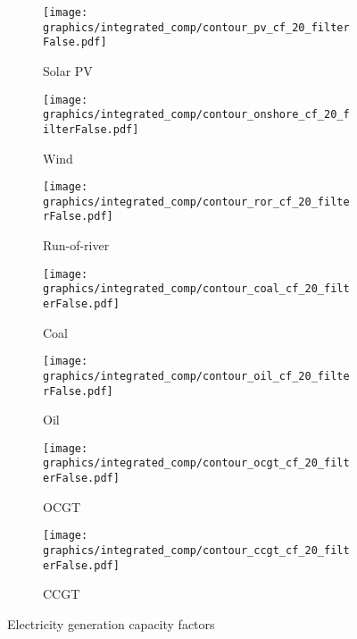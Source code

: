 \begin{figure*}[t] %
    \centering
    \begin{subfigure}[b]{0.45\linewidth}
        \centering
        \texttt{[image: graphics/integrated\_comp/contour\_pv\_cf\_20\_filterFalse.pdf]}
        \caption{Solar PV}
    \end{subfigure}
    \hfill
    \begin{subfigure}[b]{0.45\linewidth}
        \centering
        \texttt{[image: graphics/integrated\_comp/contour\_onshore\_cf\_20\_filterFalse.pdf]}
        \caption{Wind}
    \end{subfigure}
    \hfill
    \begin{subfigure}[b]{0.45\linewidth}
        \centering
        \texttt{[image: graphics/integrated\_comp/contour\_ror\_cf\_20\_filterFalse.pdf]}
        \caption{Run-of-river}
    \end{subfigure}
    \hfill
    \begin{subfigure}[b]{0.45\linewidth}
        \centering
        \texttt{[image: graphics/integrated\_comp/contour\_coal\_cf\_20\_filterFalse.pdf]}
        \caption{Coal}
    \end{subfigure}
    \hfill
    \begin{subfigure}[b]{0.45\linewidth}
        \centering
        \texttt{[image: graphics/integrated\_comp/contour\_oil\_cf\_20\_filterFalse.pdf]}
        \caption{Oil}
    \end{subfigure}
    \hfill
    \begin{subfigure}[b]{0.45\linewidth}
        \centering
        \texttt{[image: graphics/integrated\_comp/contour\_ocgt\_cf\_20\_filterFalse.pdf]}
        \caption{OCGT}
    \end{subfigure}
    \hfill
    \begin{subfigure}[b]{0.45\linewidth}
        \centering
        \texttt{[image: graphics/integrated\_comp/contour\_ccgt\_cf\_20\_filterFalse.pdf]}
        \caption{CCGT}
    \end{subfigure}
    \hfill

    \caption{Electricity generation capacity factors}
    \label{fig:capacities}
\end{figure*}





